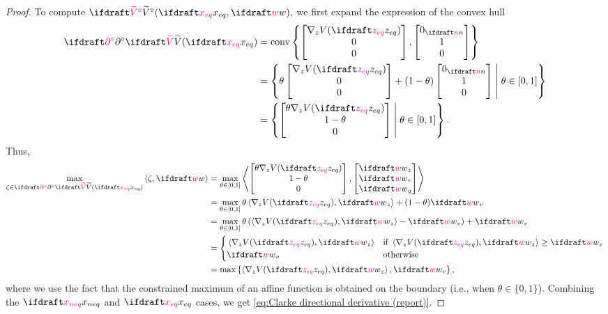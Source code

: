 {\begin{proof}
    To compute $\tVc(\xeq, \flowdir),$ we first expand the expression of the convex hull
    \begin{align*}
        \ggrad \tV(\xeq) &= \convex\setdef{\mat{\nabla_z V(\zeq) \\ 0 \\ 0},
                                           \mat{\zerovec{\nplant} \\ 1 \\ 0}}
        \\ &= \setdef{\theta \mat{\nabla_z V(\zeq) \\ 0 \\ 0} 
                    + (1-\theta) \mat{\zerovec{\nplant} \\ 1 \\ 0} 
                                \suchthat \theta \in [0, 1]}
        \\ &= \setdef{ \mat{\theta \nabla_z V(\zeq) \\ 1-\theta \\ 0} 
                                \suchthat \theta \in [0, 1] }.
    \end{align*}
    Thus,
    \begin{align*}
        \max_{\zeta\in \ggrad \tV(\xeq)} \ip{\zeta}{\flowdir} 
        &=\max_{\theta \in [0, 1]} \ip{\mat{\theta \nabla_z V(\zeq) \\ 1-\theta \\ 0} }
                                      {\mat{\flowdir_z \\ \flowdir_v \\ \flowdir_q}} \\
        &=\max_{\theta \in [0, 1]} \theta\ip{\nabla_z V(\zeq)}{\flowdir_z} 
                                    + (1 - \theta) \flowdir_v \\
        &=\max_{\theta \in [0, 1]} \theta\left(\ip{\nabla_z V(\zeq)}{\flowdir_z} - \flowdir_v\right) + \flowdir_v \\
        &=\begin{cases}\, 
                \ip{\nabla_z V(\zeq)}{\flowdir_z} & \textif \ip{\nabla_z V(\zeq)}{\flowdir_z} \geq \flowdir_v \\
                \flowdir_v & \textotherwise
            \end{cases} \\ 
        &= \max\setdef{\ip{\nabla_z V(\zeq)}{\flowdir_z}, \flowdir_v},
    \end{align*}
    where we use the fact that the constrained 
    maximum of an affine function is obtained 
    on the boundary
    (i.e., when $\theta\in\{0, 1\}$).
    Combining the $\xneq$ and $\xeq$ cases, 
    we get \cref{eq:Clarke directional derivative (report)}.
\end{proof}
}

